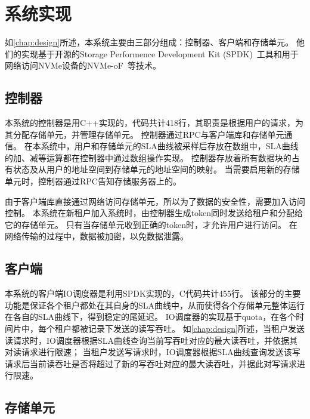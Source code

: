 
\chapter{系统实现}
\label{chap:impl}

如\autoref{chap:design}所述，本系统主要由三部分组成：控制器、客户端和存储单元。
他们的实现基于开源的Storage Performence Development Kit (SPDK)~\cite{yang2017spdk}工具和用于网络访问NVMe设备的NVMe-oF~\cite{nvmeof2016}等技术。

\section{控制器}
\label{sec:impl-controller}

本系统的控制器是用C++实现的，代码共计418行，其职责是根据用户的请求，为其分配存储单元，并管理存储单元。
控制器通过RPC与客户端库和存储单元通信。
在本系统中，用户和存储单元的SLA曲线被采样后存放在数组中，SLA曲线的加、减等运算都在控制器中通过数组操作实现。
控制器存放着所有数据块的占有状态及从用户的地址空间到存储单元的地址空间的映射。
当需要启用新的存储单元时，控制器通过RPC告知存储服务器上的。

由于客户端库直接通过网络访问存储单元，所以为了数据的安全性，需要加入访问控制。
本系统在新租户加入系统时，由控制器生成token同时发送给租户和分配给它的存储单元。
只有当存储单元收到正确的token时，才允许用户进行访问。
在网络传输的过程中，数据被加密，以免数据泄露。

\section{客户端}
\label{sec:impl-client}

本系统的客户端IO调度器是利用SPDK实现的，C代码共计455行。
该部分的主要功能是保证各个租户都处在其自身的SLA曲线中，从而使得各个存储单元整体运行在各自的SLA曲线下，得到稳定的尾延迟。
IO调度器的实现基于quota，在各个时间片中，每个租户都被记录下发送的读写吞吐。
如\autoref{chap:design}所述，当租户发送读请求时，IO调度器根据SLA曲线查询当前写吞吐对应的最大读吞吐，并依据其对读请求进行限速；
当租户发送写请求时，IO调度器根据SLA曲线查询发送该写请求后当前读吞吐是否将超过了新的写吞吐对应的最大读吞吐，并据此对写请求进行限速。

\section{存储单元}
\label{sec:impl-storage-unit}

